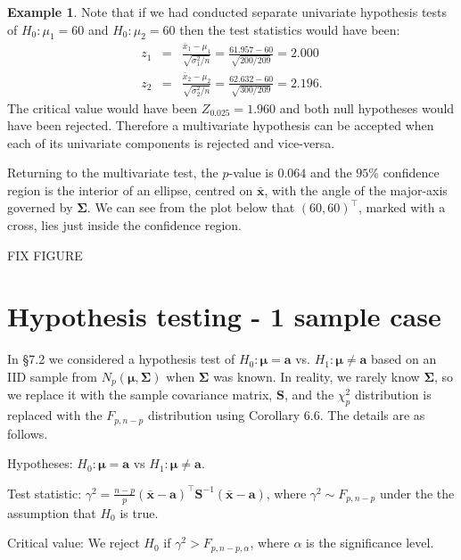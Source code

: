 \documentclass[]{book}
\theoremstyle{definition}
\theoremstyle{definition}
\newtheorem{example}{Example}[chapter]
\theoremstyle{definition}
\theoremstyle{remark}
\begin{document}
\begin{example}
Note that if we had conducted separate univariate hypothesis tests of \(H_0: \mu_1 = 60\) and \(H_0: \mu_2 = 60\) then the test statistics would have been:
\begin{eqnarray*}
z_1 &=& \frac{\bar{x}_1 - \mu_1}{\sqrt{\sigma_1^2/n}} = \frac{61.957-60}{\sqrt{200/209}} = 2.000 \\
z_2 &=& \frac{\bar{x}_2 - \mu_2}{\sqrt{\sigma_2^2/n}} = \frac{62.632-60}{\sqrt{300/209}} = 2.196.
\end{eqnarray*}
The critical value would have been \(Z_{0.025} = 1.960\) and both null hypotheses would have been rejected. Therefore a multivariate hypothesis can be accepted when each of its univariate components is rejected and vice-versa.

Returning to the multivariate test, the \(p\)-value is \(0.064\) and the \(95\)\% confidence region is the interior of an ellipse, centred on \(\bar{\boldsymbol x}\), with the angle of the major-axis governed by \(\boldsymbol \Sigma\). We can see from the plot below that \((60,60)^\top\), marked with a cross, lies just inside the confidence region.

FIX FIGURE
\end{example}

\hypertarget{hypothesis-testing---1-sample-case}{%
\section{Hypothesis testing - 1 sample case}\label{hypothesis-testing---1-sample-case}}

In \S 7.2 we considered a hypothesis test of \(H_0: \boldsymbol \mu= \boldsymbol a\) vs. \(H_1: \boldsymbol \mu\neq \boldsymbol a\) based on an IID sample from \(N_p(\boldsymbol \mu,\boldsymbol \Sigma)\) when \(\boldsymbol \Sigma\) was known. In reality, we rarely know \(\boldsymbol \Sigma\), so we replace it with the sample covariance matrix, \(\boldsymbol S\), and the \(\chi^2_p\) distribution is replaced with the \(F_{p,n-p}\) distribution using Corollary 6.6. The details are as follows.

Hypotheses: \(H_0: \boldsymbol \mu= \boldsymbol a\) vs \(H_1: \boldsymbol \mu\neq \boldsymbol a\).

Test statistic: \(\gamma^2 = \frac{n-p}{p} (\bar{\boldsymbol x}-\boldsymbol a)^\top \boldsymbol S^{-1} (\bar{\boldsymbol x}-\boldsymbol a)\), where \(\gamma^2 \sim F_{p,n-p}\) under the the assumption that \(H_0\) is true.

Critical value: We reject \(H_0\) if \(\gamma^2 > F_{p,n-p,\alpha}\), where \(\alpha\) is the significance level.
\end{document}
